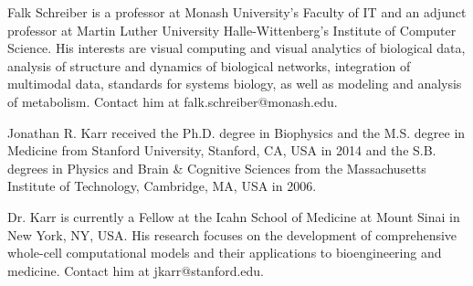 \documentclass[journal,transmag]{IEEEtran}
\begin{document}
\begin{IEEEbiography}{Falk Schreiber}
 is a professor at Monash University's Faculty of IT and an adjunct professor at Martin Luther University Halle-Wittenberg's Institute of Computer Science. His interests are visual computing and visual analytics of biological data, analysis of structure and dynamics of biological networks, integration of multimodal data, standards for systems biology, as well as modeling and analysis of metabolism.
Contact him at falk.schreiber@monash.edu.
\end{IEEEbiography}

\begin{IEEEbiography}{Jonathan R. Karr}
received the Ph.D. degree in Biophysics and the M.S. degree in Medicine from Stanford University, Stanford, CA, USA in 2014 and the S.B. degrees in Physics and Brain \& Cognitive Sciences from the Massachusetts Institute of Technology, Cambridge, MA, USA in 2006. 

Dr. Karr is currently a Fellow at the Icahn School of Medicine at Mount Sinai in New York, NY, USA. His research focuses on the development of comprehensive whole-cell computational models and their applications to bioengineering and medicine. Contact him at jkarr@stanford.edu.
\end{IEEEbiography}




\end{document}
